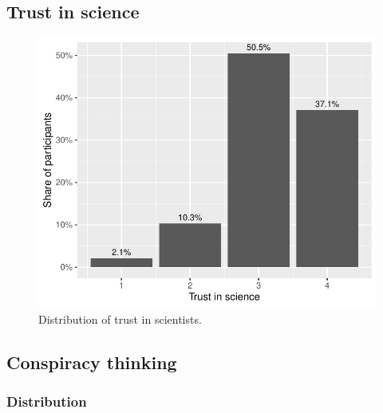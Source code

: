 \documentclass[
  doc,floatsintext]{apa6}
\begin{document}
\subsection{Trust in science}\label{trust-in-science-3}



\begin{figure}
\centering
\includegraphics{output/figures/exp1-trust-scientists.pdf}
\caption{\label{fig:exp1-trust-scientists}Distribution of trust in scientists.}
\end{figure}

\subsection{Conspiracy thinking}\label{conspiracy-thinking}

\subsubsection{Distribution}\label{distribution}
\end{document}
